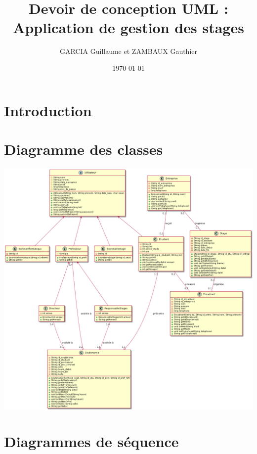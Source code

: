 \documentclass[11pt, a4paper]{report}
\title{Devoir de conception UML :\\Application de gestion des stages}
\author{GARCIA  Guillaume et ZAMBAUX Gauthier}
\date{\today}
\begin{document}
\maketitle


\chapter*{Introduction}


\chapter*{Diagramme des classes}
\centerline{\includegraphics[scale=0.4]{Images/diagrammedesclasses.png}}


\chapter*{Diagrammes de séquence}
\end{document}
